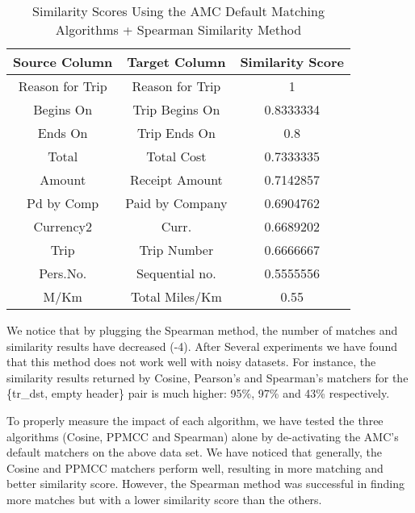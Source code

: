 \begin{table}[ht]
\centering
\begin{tabular}{|c|c|c|}
\hline
{\bf Source Column} & {\bf Target Column} & {\bf Similarity Score} \\ \hline
Reason for Trip                & Reason for Trip                & 1                                 \\ \hline
Begins On                      & Trip Begins On                 & 0.8333334                         \\ \hline
Ends On                        & Trip Ends On                   & 0.8                               \\ \hline
Total                          & Total Cost                     & 0.7333335                         \\ \hline
Amount                         & Receipt Amount                 & 0.7142857                         \\ \hline
Pd by Comp                     & Paid by Company                & 0.6904762                         \\ \hline
Currency2                      & Curr.                          & 0.6689202                         \\ \hline
Trip                           & Trip Number                    & 0.6666667                         \\ \hline
Pers.No.                       & Sequential no.                 & 0.5555556                         \\ \hline
M/Km                           & Total Miles/Km                 & 0.55                              \\ \hline
\end{tabular}
\caption{ Similarity Scores Using the AMC Default Matching Algorithms + Spearman Similarity Method}
\label{tab:Similarity_Scores_Using_the_AMC_Default_Matching_Algorithms_+_Spearman_Similarity_Method}
\end{table}

We notice that by plugging the Spearman method, the number of matches and similarity results have decreased (-4). After Several experiments we have found that this method does not work well with noisy datasets. For instance, the similarity results returned by Cosine, Pearson's and Spearman's matchers for the \{tr\_dst, empty header\} pair is much higher: 95\%, 97\% and 43\% respectively.

To properly measure the impact of each algorithm, we have tested the three algorithms (Cosine, PPMCC and Spearman) alone by de-activating the AMC's default matchers on the above data set. We have noticed that generally, the Cosine and PPMCC matchers perform well, resulting in more matching and better similarity score. However, the Spearman method was successful in finding more matches but with a lower similarity score than the others.

